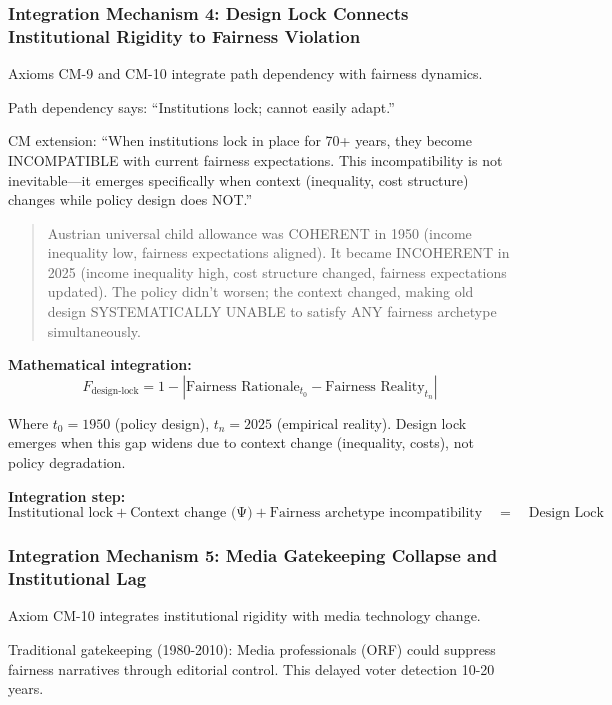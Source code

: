 \subsubsection{Integration Mechanism 4: Design Lock Connects Institutional Rigidity to Fairness Violation}

Axioms CM-9 and CM-10 integrate path dependency with fairness dynamics.

Path dependency says: ``Institutions lock; cannot easily adapt.''

CM extension: ``When institutions lock in place for 70+ years, they become INCOMPATIBLE with
current fairness expectations. This incompatibility is not inevitable---it emerges specifically
when context (inequality, cost structure) changes while policy design does NOT.''

\begin{quote}
Austrian universal child allowance was COHERENT in 1950 (income inequality low, fairness expectations aligned).
It became INCOHERENT in 2025 (income inequality high, cost structure changed, fairness expectations updated).
The policy didn't worsen; the context changed, making old design SYSTEMATICALLY UNABLE to satisfy
ANY fairness archetype simultaneously.
\end{quote}

\textbf{Mathematical integration:}
\begin{equation}
F_{\text{design-lock}} = 1 - |\text{Fairness Rationale}_{t_0} - \text{Fairness Reality}_{t_n}|
\end{equation}

Where $t_0 = 1950$ (policy design), $t_n = 2025$ (empirical reality). Design lock emerges when this gap
widens due to context change (inequality, costs), not policy degradation.

\textbf{Integration step:}
\begin{equation}
\text{Institutional lock} + \text{Context change (Ψ)} + \text{Fairness archetype incompatibility} \quad = \quad \text{Design Lock}
\end{equation}

\subsubsection{Integration Mechanism 5: Media Gatekeeping Collapse and Institutional Lag}

Axiom CM-10 integrates institutional rigidity with media technology change.

Traditional gatekeeping (1980-2010): Media professionals (ORF) could suppress fairness narratives through
editorial control. This delayed voter detection 10-20 years.

